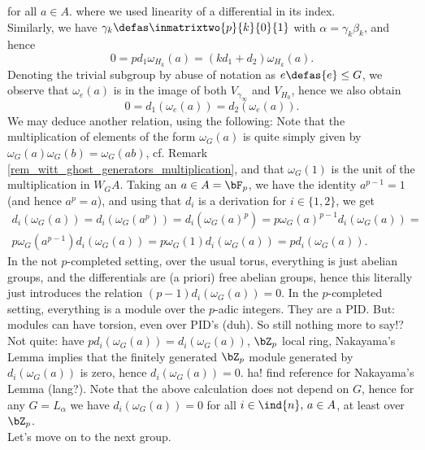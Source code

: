 for all $a \in A$. where we used linearity of a differential in its index.\\
Similarly, we have $\gamma_k \defas \inmatrixtwo{p}{k}{0}{1}$ with $\alpha = \gamma_k \beta_k$, and hence
\begin{equation}\label{eq_group_diag(p,p)_subgroup_(p,k_0,1)}
	0 = p d_1  \omega_{H_k}(a) = (k d_1 + d_2) \omega_{H_k}(a).
\end{equation}
Denoting the trivial subgroup by abuse of notation as $e \defas \{e\} \leq G$, we observe that $\omega_e(a)$ is in the image of both $V_{\gamma_\infty}$ and $V_{H_0}$, hence we also obtain
\begin{equation*}
	0 = d_1(\omega_e(a)) = d_2 (\omega_e(a)).
\end{equation*}
We may deduce another relation, using the following: Note that the multiplication of elements of the form $\omega_G(a)$ is quite simply given by $\omega_G (a) \omega_G (b) = \omega_G (ab)$, cf. Remark \ref{rem_witt_ghost_generators_multiplication}, and that $\omega_G(1)$ is the unit of the multiplication in $W_G A$. Taking an $a \in A = \bF_p$, we have the identity $a^{p-1} = 1$ (and hence $a^p=a$), and using that $d_i$ is a derivation for $i \in \{1,2\}$, we get
\begin{gather*}
	d_i(\omega_G(a)) = d_i(\omega_G(a^p)) = d_i(\omega_G(a)^p) = p \omega_G(a)^{p-1} d_i(\omega_G(a)) = \\ %
	p \omega_G(a^{p-1}) d_i(\omega_G(a)) = p \omega_G(1) d_i(\omega_G(a)) = p d_i(\omega_G(a)). %
\end{gather*}
 In the not $p$-completed setting, over the usual torus, everything is just abelian groups, and the differentials are (a priori) free abelian groups, hence this literally just introduces the relation $(p-1)d_i (\omega_G(a)) = 0$. In the $p$-completed setting, everything is a module over the $p$-adic integers. They are a PID. But: modules can have torsion, even over PID's (duh). So still nothing more to say!? Not quite: have $p d_i (\omega_G(a)) = d_i (\omega_G(a))$, $\bZ_p$ local ring, Nakayama's Lemma implies that the finitely generated $\bZ_p$ module generated by $d_i (\omega_G(a))$ is zero, hence $d_i (\omega_G(a)) = 0$. ha! find reference for Nakayama's Lemma (lang?). Note that the above calculation does not depend on $G$, hence for any $G = L_\alpha$ we have $d_i(\omega_G(a)) = 0$ for all $i\in \ind{n},\, a \in A$, at least over $\bZ_p$.\\
Let's move on to the next group.

